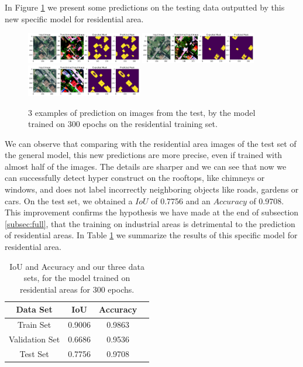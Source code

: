 \documentclass[9pt,conference,compsocconf]{IEEEtran}
\begin{document}
In Figure \ref{fig:residencial_pred} we present some predictions on the testing data outputted by this new specific model for residential area.

\begin{figure}[h!]
    \centering
    \includegraphics[width=0.45\textwidth]{figures/pred_residencial_1.png}
    \includegraphics[width=0.45\textwidth]{figures/pred_residencial_2.png}
    \includegraphics[width=0.45\textwidth]{figures/pred_residencial_3.png}
    \caption{\footnotesize{3 examples of prediction on images from the test, by the model trained on 300 epochs on the residential training set.}}
    \label{fig:residencial_pred}
\end{figure}

We can observe that comparing with the residential area images of the test set of the general model, this new predictions are more precise, even if trained with almost half of the images. The details are sharper and we can see that now we can successfully detect hyper construct on the rooftops, like chimneys or windows, and does not label incorrectly neighboring objects like roads, gardens or cars. 
On the test set, we obtained a $IoU$ of 0.7756 and an $Accuracy$ of 0.9708. This improvement confirms the hypothesis we have made at the end of subsection \ref{subsec:full}, that the training on industrial areas is detrimental to the prediction of residential areas. In Table \ref{fig:my_labelres} we summarize the results of this specific model for residential area. 

\begin{table}[h!]
    \centering
    \begin{tabular}{ |c|c|c|c| } 
\hline
Data Set & IoU & Accuracy \\
\hline
Train Set & 0.9006 & 0.9863 \\ 
Validation Set & 0.6686 & 0.9536 \\ 
Test Set & 0.7756 & 0.9708 \\ 
\hline
\end{tabular}
    \caption{\footnotesize{IoU and Accuracy and our three data sets, for the model trained on residential areas for 300 epochs.}
    \label{fig:my_labelres}}
\end{table}
\end{document}
